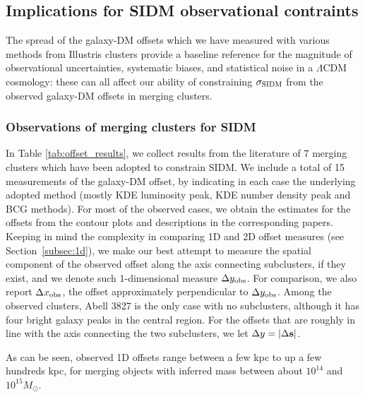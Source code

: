 \documentclass[usenatbib]{mn2e}
\newcommand{\sigmaSIDM}{\sigma_{\rm SIDM}}
\begin{document}
{ 
 
\subsection{Implications for SIDM observational contraints}  
\label{subsec:SIDMimplications}
  
The spread of the galaxy-DM offsets which we have measured with various methods from Illustris clusters provide a baseline reference for the magnitude of observational uncertainties, systematic biases, and statistical noise in a $\Lambda$CDM cosmology: these can all affect our ability of constraining $\sigmaSIDM$ from the observed galaxy-DM offsets in merging clusters.

  
\subsubsection{Observations of merging clusters for SIDM} 

In Table \ref{tab:offset_results}, we collect results from the literature of 7 merging clusters which have been adopted to constrain SIDM. We include a total of 15 measurements of the galaxy-DM offset, by indicating in each case the underlying adopted method (mostly KDE luminosity peak, KDE number density peak and BCG methods). For most of the observed cases, we obtain the estimates for the offsets from the contour plots and descriptions in the corresponding papers. Keeping in mind the complexity in comparing 1D and 2D offset measures (see Section~\ref{subsec:1d}), we make our best attempt to measure the spatial component of the
observed offset along the axis connecting subclusters, if they exist, and we denote such 1-dimensional measure $\Delta y_{\rm obs}$.
For comparison, we also report $\Delta x_{\rm obs}$, the offset approximately perpendicular to
$\Delta y_{\rm obs}$.
Among the observed clusters, Abell 3827 is the only case with no
subclusters, although it has four bright galaxy peaks in the central region.   
For the offsets that are roughly in line with the axis connecting the two subclusters,
we let $\Delta y = |\Delta {\bf s}|$. 

As can be seen, observed 1D offsets range between a few kpc to up a few hundreds kpc, for merging objects with inferred mass between about $10^{14}$ and $10^{15} M_\odot$.  

}
\end{document}
